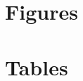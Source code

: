 \documentclass[12pt,english]{article}
\begin{document}
\pagebreak
\begingroup
{}
\setlength\bibitemsep{0pt}
\printbibliography
\endgroup
\pagebreak

\begin{appendices}
\section{Figures}\label{appendix:figs}



\newpage


\section{Tables}\label{appendix:tabs}

% 


\end{appendices}
\end{document}
